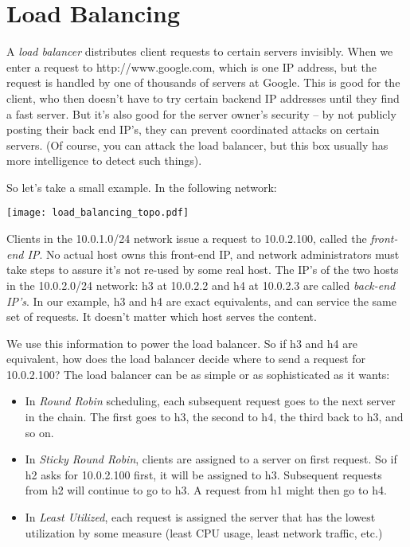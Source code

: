 \section{Load Balancing}

A \emph{load balancer} distributes client requests to certain servers invisibly.  When
we enter a request to http://www.google.com, which is one IP address, but the request is handled
by one of thousands of servers at Google.  This is good for the client, who then doesn't have to 
try certain backend IP addresses until they find a fast server.  But it's also good for the 
server owner's security -- by not publicly posting their back end IP's, they can prevent 
coordinated attacks on certain servers.  (Of course, you can attack the load balancer, but 
this box usually has more intelligence to detect such things).  

So let's take a small example.  In the following network:

\texttt{[image: load\_balancing\_topo.pdf]}

Clients in the 10.0.1.0/24 network issue a request to 10.0.2.100, called the \emph{front-end IP}.
No actual host owns this front-end IP, and network administrators must take steps to assure
it's not re-used by some real host.  The IP's of the two hosts in the 10.0.2.0/24 network: 
h3 at 10.0.2.2 and h4 at 10.0.2.3 are called \emph{back-end IP's}.  In our example,
h3 and h4 are exact equivalents, and can service the same set of requests.  It doesn't matter
which host serves the content.  

We use this information to power the load balancer.  So if h3 and h4 are equivalent, how
does the load balancer decide where to send a request for 10.0.2.100?  The load balancer
can be as simple or as sophisticated as it wants:

\begin{itemize}
\item In \emph{Round Robin} scheduling, each subsequent request goes to the next server in the 
chain.  The first goes to h3, the second to h4, the third back to h3, and so on.  
\item In \emph{Sticky Round Robin}, clients are assigned to a server on first request.  So 
if h2 asks for 10.0.2.100 first, it will be assigned to h3.  Subsequent requests from h2
will continue to go to h3.  A request from h1 might then go to h4.  
\item In \emph{Least Utilized}, each request is assigned the server that has the lowest 
utilization by some measure (least CPU usage, least network traffic, etc.)
\end{itemize}

